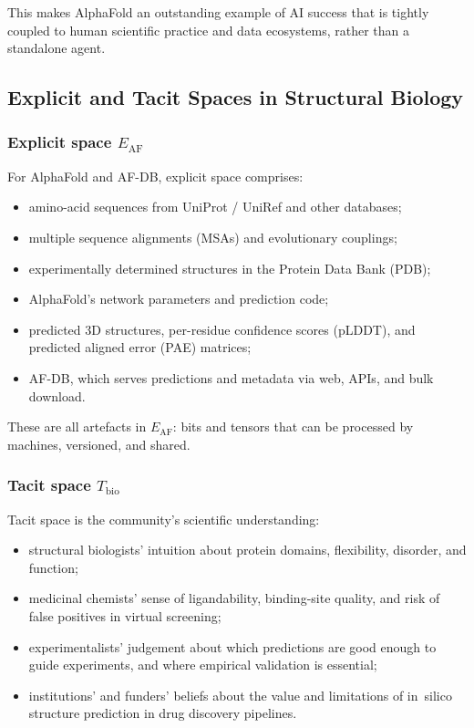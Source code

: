 This makes AlphaFold an outstanding example of AI success that is tightly
coupled to human scientific practice and data ecosystems, rather than a
standalone agent.

\subsection{Explicit and Tacit Spaces in Structural Biology}

\subsubsection*{Explicit space \(E_{\mathrm{AF}}\)}

For AlphaFold and AF-DB, explicit space comprises:

\begin{itemize}
  \item amino-acid sequences from UniProt / UniRef and other databases;
  \item multiple sequence alignments (MSAs) and evolutionary couplings;
  \item experimentally determined structures in the Protein Data Bank (PDB);
  \item AlphaFold’s network parameters and prediction code;
  \item predicted 3D structures, per-residue confidence scores (pLDDT),
        and predicted aligned error (PAE) matrices;
  \item AF-DB, which serves predictions and metadata via web, APIs, and bulk
        download.
\end{itemize}

These are all artefacts in \(E_{\mathrm{AF}}\):
bits and tensors that can be processed by machines, versioned, and shared.

\subsubsection*{Tacit space \(T_{\mathrm{bio}}\)}

Tacit space is the community’s scientific understanding:

\begin{itemize}
  \item structural biologists’ intuition about protein domains, flexibility,
        disorder, and function;
  \item medicinal chemists’ sense of ligandability, binding-site quality,
        and risk of false positives in virtual screening;
  \item experimentalists’ judgement about which predictions are good enough
        to guide experiments, and where empirical validation is essential;
  \item institutions’ and funders’ beliefs about the value and limitations
        of in~silico structure prediction in drug discovery pipelines.
\end{itemize}

